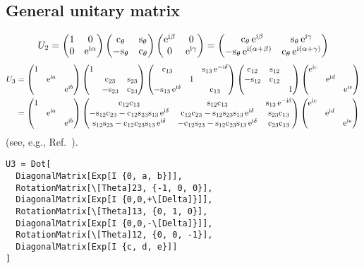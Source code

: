 \documentclass[CheatSheet]{subfiles}
\begin{document}
\subsection{General unitary matrix}
\begin{equation}
 U_2 =
\begin{pmatrix}1&0\\0&\mathop{}\!\mathrm{e}^{\mathrm{i}\alpha}\end{pmatrix}\begin{pmatrix}\mathrm{c}_{\theta}&\mathrm{s}_{\theta}\\-\mathrm{s}_{\theta}&\mathrm{c}_{\theta}\end{pmatrix}\begin{pmatrix}\mathop{}\!\mathrm{e}^{\mathrm{i}\beta}&0\\0&\mathop{}\!\mathrm{e}^{\mathrm{i}\gamma}\end{pmatrix}
=
\begin{pmatrix}\phantom{-}
\mathrm{c}_{\theta}\mathop{}\!\mathrm{e}^{\mathrm{i}\beta} & \mathrm{s}_{\theta}\mathop{}\!\mathrm{e}^{\mathrm{i}\gamma}\\
-\mathrm{s}_{\theta}\mathop{}\!\mathrm{e}^{\mathrm{i}(\alpha+\beta)} & \mathrm{c}_{\theta}\mathop{}\!\mathrm{e}^{\mathrm{i}(\alpha+\gamma)}
\end{pmatrix}
\end{equation}
\begin{align}
 U_3 &=
\pmat{1&&\\&\ee^{\ii a}&\\&&\ee^{\ii b}}
 \pmat{1&&\\&\co{23}&\si{23}\\&-\si{23}&\co{23}}
 \pmat{\co{13}&&\si{13}\ee^{-\ii\delta}\\&1&\\-\si{13}\ee^{\ii\delta}&&\co{13}}
 \pmat{\co{12}&\si{12}&\\-\si{12}&\co{12}&\\&&1}
\pmat{\ee^{\ii c}&&\\&\ee^{\ii d}&\\&&\ee^{\ii e}}
\\&=
\pmat{1&&\\&\ee^{\ii a}&\\&&\ee^{\ii b}}
 \pmat{
 \co{12} \co{13} & \si{12} \co{13} & \si{13} \ee^{-\ii\delta}\\
 -\si{12} \co{23} - \co{12} \si{23} \si{13} \ee^{\ii\delta}& \co{12} \co{23} - \si{12}\si{23}\si{13} \ee^{\ii\delta}& \si{23}\co{13}\\
  \si{12}\si{23} - \co{12} \co{23} \si{13}\ee^{\ii\delta} & -\co{12}\si{23}-\si{12}\co{23}\si{13}\ee^{\ii\delta} & \co{23} \co{13}}
\pmat{\ee^{\ii c}&&\\&\ee^{\ii d}&\\&&\ee^{\ii e}}
\label{eq:GeneralUnitary33}
\end{align}
(see, e.g., Ref.~\cite{Rasin:1997pn}).

\begin{verbatim}
U3 = Dot[
  DiagonalMatrix[Exp[I {0, a, b}]],
  RotationMatrix[\[Theta]23, {-1, 0, 0}],
  DiagonalMatrix[Exp[I {0,0,+\[Delta]}]],
  RotationMatrix[\[Theta]13, {0, 1, 0}],
  DiagonalMatrix[Exp[I {0,0,-\[Delta]}]],
  RotationMatrix[\[Theta]12, {0, 0, -1}],
  DiagonalMatrix[Exp[I {c, d, e}]]
]
\end{verbatim}
\end{document}
